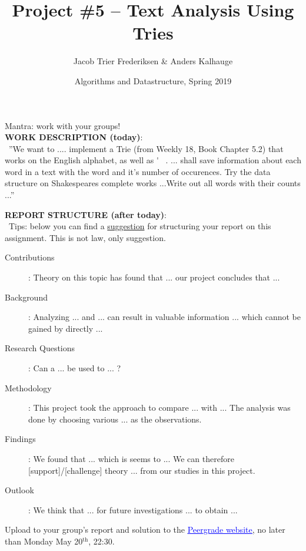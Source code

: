 \documentclass[12pt,a4paper,final]{article}
\title{Project \#5 -- Text Analysis Using Tries}
\author{Jacob Trier Frederiksen \& Anders Kalhauge}
\date{Algorithms and Datastructure, Spring 2019}
\begin{document}
\maketitle

Mantra: work with your groups! \\

\textbf{WORK DESCRIPTION (today)}: \\ ''We want to .... implement a Trie (from Weekly 18, Book Chapter 5.2) that works on the English alphabet, as well as \' ~.
... shall save information about each word in a text with the word and it's number of occurences. Try the data structure on Shakespeares complete works ...Write out all words with their counts ...''

\textbf{REPORT STRUCTURE (after today)}: \\ Tips: below you can find a \underline{suggestion} for structuring your report on this assignment. This is not law, only suggestion.
\begin{description}
   \item[Contributions]: Theory on this topic has found that ... our project concludes that ... 
   \item[Background]: Analyzing ...  and ...  can result in valuable information ... which cannot be gained by directly ... 
   \item[Research Questions]: Can a ... be used to ... ? 
   \item[Methodology]: This project took the approach to compare ... with ... The analysis was done by choosing various ... as the observations. 
   \item[Findings]: We found that ... which is seems to ... We can therefore [support]/[challenge] theory ... from our studies in this project.
   \item[Outlook]: We think that ... for future investigations ... to obtain ... 
\end{description}

Upload to your group's report and solution to the \href{https://www.peergrade.io}{\textcolor{blue}{\underline{Peergrade website}}}, no later than Monday May 20$^\textrm{th}$, 22:30. 
\end{document}
